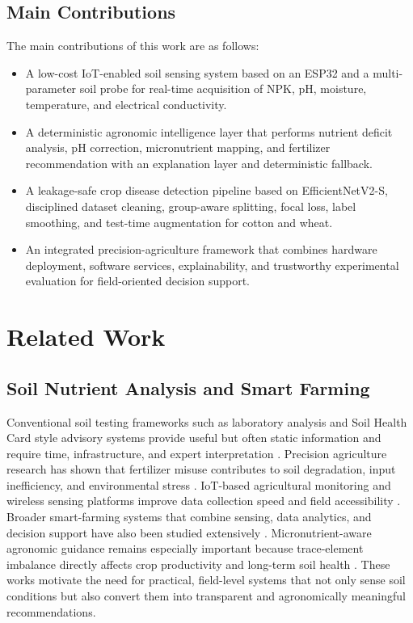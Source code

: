 \documentclass[conference]{IEEEtran}
\begin{document}
\subsection{Main Contributions}
The main contributions of this work are as follows:
\begin{itemize}
\item A low-cost IoT-enabled soil sensing system based on an ESP32 and a multi-parameter soil probe for real-time acquisition of NPK, pH, moisture, temperature, and electrical conductivity.
\item A deterministic agronomic intelligence layer that performs nutrient deficit analysis, pH correction, micronutrient mapping, and fertilizer recommendation with an explanation layer and deterministic fallback.
\item A leakage-safe crop disease detection pipeline based on EfficientNetV2-S, disciplined dataset cleaning, group-aware splitting, focal loss, label smoothing, and test-time augmentation for cotton and wheat.
\item An integrated precision-agriculture framework that combines hardware deployment, software services, explainability, and trustworthy experimental evaluation for field-oriented decision support.
\end{itemize}

\section{Related Work}

\subsection{Soil Nutrient Analysis and Smart Farming}
Conventional soil testing frameworks such as laboratory analysis and Soil Health Card style advisory systems provide useful but often static information and require time, infrastructure, and expert interpretation \cite{b1,b2,b3}. Precision agriculture research has shown that fertilizer misuse contributes to soil degradation, input inefficiency, and environmental stress \cite{b4,b9}. IoT-based agricultural monitoring and wireless sensing platforms improve data collection speed and field accessibility \cite{b6,b7,b11,b12}. Broader smart-farming systems that combine sensing, data analytics, and decision support have also been studied extensively \cite{b5,b10}. Micronutrient-aware agronomic guidance remains especially important because trace-element imbalance directly affects crop productivity and long-term soil health \cite{b8}. These works motivate the need for practical, field-level systems that not only sense soil conditions but also convert them into transparent and agronomically meaningful recommendations.
\end{document}

